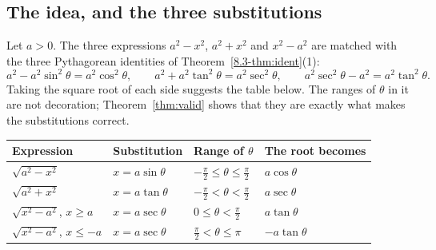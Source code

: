 \documentclass[11pt]{article}
\begin{document}
\subsection*{The idea, and the three substitutions}

Let $a>0$. The three expressions $a^2-x^2$, $a^2+x^2$ and $x^2-a^2$ are matched with the three Pythagorean identities of Theorem~\ref{8.3-thm:ident}(1):
\[a^2-a^2\sin^2\theta=a^2\cos^2\theta,\qquad a^2+a^2\tan^2\theta=a^2\sec^2\theta,\qquad a^2\sec^2\theta-a^2=a^2\tan^2\theta .\]
Taking the square root of each side suggests the table below. The ranges of $\theta$ in it are not decoration; Theorem~\ref{thm:valid} shows that they are exactly what makes the substitutions correct.

\begin{center}
\renewcommand{\arraystretch}{1.3}
\begin{tabular}{llll}
\textbf{Expression} & \textbf{Substitution} & \textbf{Range of $\theta$} & \textbf{The root becomes}\\ \hline
$\sqrt{a^2-x^2}$ & $x=a\sin\theta$ & $-\frac\pi2\le\theta\le\frac\pi2$ & $a\cos\theta$\\
$\sqrt{a^2+x^2}$ & $x=a\tan\theta$ & $-\frac\pi2<\theta<\frac\pi2$ & $a\sec\theta$\\
$\sqrt{x^2-a^2}$, $x\ge a$ & $x=a\sec\theta$ & $0\le\theta<\frac\pi2$ & $a\tan\theta$\\
$\sqrt{x^2-a^2}$, $x\le-a$ & $x=a\sec\theta$ & $\frac\pi2<\theta\le\pi$ & $-a\tan\theta$\\
\end{tabular}
\end{center}
\end{document}
